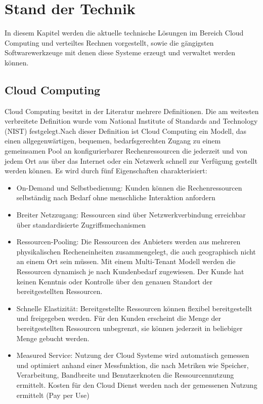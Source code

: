 \chapter{Stand der Technik}

In diesem Kapitel werden die aktuelle technische Lösungen im Bereich Cloud Computing und verteiltes Rechnen vorgestellt, sowie die gängigsten Softwarewerkzeuge mit denen diese Systeme erzeugt und verwaltet werden können.

\section{Cloud Computing}
Cloud Computing besitzt in der Literatur mehrere Definitionen.\cite{Marston2011} Die am weitesten verbreitete Definition wurde vom National Institute of Standards and Technology (NIST) festgelegt.Nach dieser Definition ist Cloud Computing ein Modell, das einen allgegenwärtigen, bequemen, bedarfsgerechten Zugang zu einem gemeinsamen Pool an konfigurierbarer Rechenressourcen die jederzeit und von jedem Ort aus über das Internet oder ein Netzwerk schnell zur Verfügung gestellt 
werden können. Es wird durch fünf Eigenschaften charakterisiert:   \\
\begin{itemize}
	\item On-Demand und Selbstbedienung: Kunden können die Rechenressourcen selbständig nach Bedarf ohne menschliche Interaktion anfordern
	\item Breiter Netzzugang: Ressourcen sind über Netzwerkverbindung erreichbar über standardisierte Zugriffsmechanismen
	\item Ressourcen-Pooling: Die Ressourcen des Anbieters werden aus mehreren physikalischen Recheneinheiten zusammengelegt, die auch geographisch nicht an einem Ort sein müssen. Mit einem Multi-Tenant Modell werden die Ressourcen dynamisch je nach Kundenbedarf zugewiesen. Der Kunde hat keinen Kenntnis oder Kontrolle über den genauen Standort der bereitgestellten Ressourcen.
	\item Schnelle Elastizität: Bereitgestellte Ressourcen können flexibel bereitgestellt und freigegeben werden. Für den Kunden erscheint die Menge der bereitgestellten Ressourcen unbegrenzt, sie können jederzeit in beliebiger Menge gebucht werden.
	\item Measured Service: Nutzung der Cloud Systeme wird automatisch gemessen und optimiert anhand einer Messfunktion, die nach Metriken wie Speicher, Verarbeitung, Bandbreite und Benutzerknoten die Ressourcennutzung ermittelt. Kosten für den Cloud Dienst werden nach der gemessenen Nutzung ermittelt (Pay per Use) \cite{Mell2011}
\end{itemize}

